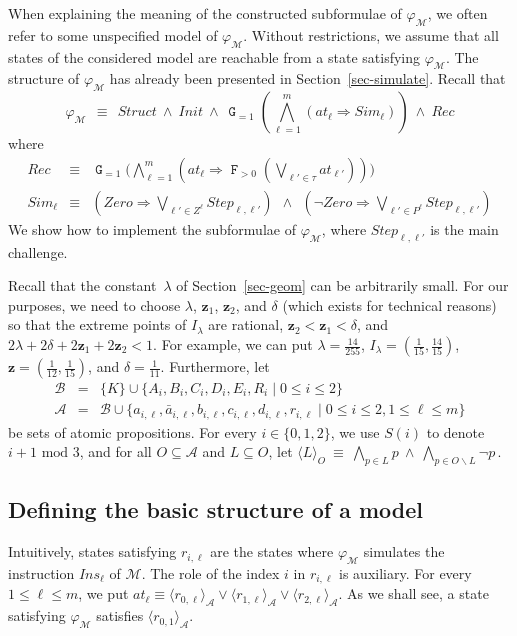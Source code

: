 \documentclass[a4paper,UKenglish,cleveref, autoref, thm-restate]{lipics-v2021}
\newcommand{\A}{\mathcal{A}}
\newcommand{\B}{\mathcal{B}}
\newcommand{\M}{\mathcal{M}}
\newcommand{\ex}[1]{\langle #1 \rangle}
\newcommand{\Init}{\mathit{Init}}
\newcommand{\Simulate}{\mathit{Sim}}
\newcommand{\Step}{\mathit{Step}}
\newcommand{\Zero}{\mathit{Zero}}
\newcommand{\Ins}{\mathit{Ins}}
\newcommand{\at}{\mathit{at}}
\renewcommand{\vec}[1]{\pmb{#1}}
\newcommand{\Struct}{\textit{Struct}}
\newcommand{\Rec}{\textit{Rec}}
\newcommand*{\opf}{\operatorname{\pmb{\mathtt{F}}}}
\newcommand*{\opg}{\operatorname{\pmb{\mathtt{G}}}}
\begin{document}
When explaining the meaning of the constructed subformulae of $\varphi_\M$, we often refer to some unspecified model of $\varphi_\M$. Without restrictions, we assume that all states of the considered model are reachable from a state satisfying $\varphi_\M$.
The structure of $\varphi_\M$ has already been presented in Section~\ref{sec-simulate}. Recall that
\begin{equation*}\textstyle
    \varphi_{\M} ~~\equiv~~ \Struct ~\wedge~ \Init ~\wedge~ 
       \opg_{=1} (\bigwedge_{\ell =1}^m (\at_\ell \Rightarrow \Simulate_\ell)) 
       ~\wedge~ \Rec
\end{equation*}
where
\begin{eqnarray*}
    \Rec & \equiv & \textstyle\opg_{=1}\big(\bigwedge_{\ell=1}^m (\at_\ell \Rightarrow \opf_{>0} (\bigvee_{\ell' \in \tau}\at_{\ell'}))\big)\\
    \Simulate_\ell & \equiv & \textstyle(\Zero \Rightarrow \bigvee_{\ell' \in Z^\ell} \Step_{\ell,\ell'}) ~~\wedge~~
    (\neg\Zero \Rightarrow \bigvee_{\ell' \in P^\ell} \Step_{\ell,\ell'})
\end{eqnarray*}
We show how to implement the subformulae of $\varphi_\M$, where $\Step_{\ell,\ell'}$ is the main challenge. 


Recall that the constant~$\lambda$ of Section~\ref{sec-geom} can be arbitrarily small. For our purposes, we need to choose $\lambda$, $\vec{z}_1$, $\vec{z}_2$, and $\delta$ (which exists for technical reasons) so that the extreme points of $I_\lambda$ are rational, $\vec{z}_2 < \vec{z}_1 < \delta$, and
$2\lambda + 2\delta + 2\vec{z}_1 + 2\vec{z}_2 < 1$.
For example, we can put $\lambda = \frac{14}{255}$, $I_\lambda =(\frac{1}{15},\frac{14}{15})$, $\vec{z} = (\frac{1}{12},\frac{1}{15})$, and $\delta = \frac{1}{11}$.  Furthermore, let
\begin{eqnarray*}
    \B & = & \{K\} \cup \{A_i,B_i,C_i,D_i,E_i,R_i \mid 0 \leq i \leq 2\}\\
    \A & = & \B \cup  \{a_{i,\ell},\bar{a}_{i,\ell},b_{i,\ell},c_{i,\ell},d_{i,\ell},r_{i,\ell} \mid 0 \leq i \leq 2, 1 \leq \ell \leq m\}
\end{eqnarray*}
be sets of atomic propositions.
For every $i \in \{0,1,2\}$, we use $S(i)$ to denote $i{+}1 \mbox{ mod } 3$, and
for all $O \subseteq \A$ and $L \subseteq O$, let
\(
    \ex{L}_O \ \equiv \  \bigwedge_{p \in L} p  ~\wedge~ \bigwedge_{p \in O \smallsetminus L} \neg p\,.
\)

\subsection{Defining the basic structure of a model}
\label{sec-structure}
Intuitively, states satisfying $r_{i,\ell}$ are the states where $\varphi_\M$ simulates the instruction $\Ins_\ell$ of $\M$. The role of the index $i$ in $r_{i,\ell}$ is auxiliary. For every $1 \leq \ell \leq m$, we put $\at_\ell \equiv \ex{r_{0,\ell}}_\A \vee \ex{r_{1,\ell}}_\A \vee \ex{r_{2,\ell}}_\A$. As we shall see, a state satisfying $\varphi_\M$ satisfies $\ex{r_{0,1}}_{\A}$.
\end{document}
